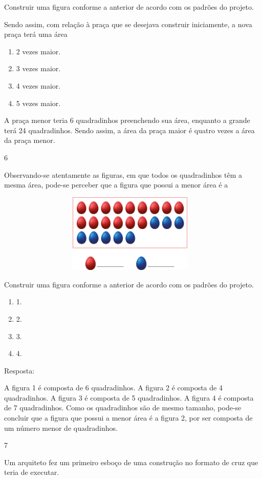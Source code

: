 \begin{mdframed}[linewidth=2pt,linecolor=salmao,roundcorner=2pt]
\begin{itemize}
{\begin{itemize}
\begin{escolha}
{Construir uma figura conforme a anterior de acordo com os padrões do
projeto.

Sendo assim, com relação à praça que se desejava construir iniciamente,
a nova praça terá uma área

\begin{enumerate}
\item
  2 vezes maior.
\item
  3 vezes maior.
\item
  4 vezes maior.
\item
  5 vezes maior.
\end{enumerate}

A praça menor teria 6 quadradinhos preenchendo sua área, enquanto a
grande terá 24 quadradinhos. Sendo assim, a área da praça maior é
quatro vezes a área da praça menor.

\num{6}

Observando-se atentamente as figuras, em que todos os quadradinhos têm a mesma área, pode-se perceber que a figura que
possui a menor área é a

\includegraphics[width=5.12179in,height=1.48342in]{media/image65.png}

Construir uma figura conforme a anterior de acordo com os padrões do
projeto.

\begin{enumerate}
\item
  1.
\item
  2.
\item
  3.
\item
  4.
\end{enumerate}

Resposta:

A figura 1 é composta de 6 quadradinhos. A figura 2 é composta de 4 quadradinhos.
A figura 3 é composta de 5 quadradinhos. A figura 4 é composta de 7 quadradinhos.
Como os quadradinhos são de mesmo tamanho, pode-se concluir que a figura
que possui a menor área é a figura 2, por ser composta de um número
menor de quadradinhos.

\num{7}

Um arquiteto fez um primeiro esboço de uma construção no formato de cruz
que teria de executar.

}
\end{escolha}
\end{itemize}}
\end{itemize}
\end{mdframed}
